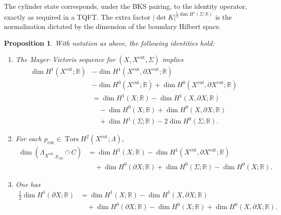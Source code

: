 \documentclass[12pt]{amsart}
\numberwithin{equation}{section}
\newtheorem{prop}[theorem]{Proposition}
\DeclareMathOperator{\Tors}{Tors}
\begin{document}
The cylinder state corresponds, under the BKS pairing, to the identity operator, exactly as required in a TQFT. The extra factor
\(|\det K|^{\frac14\dim H^1(\Sigma;\mathbb R)}\) is the normalization dictated by the dimension of the boundary Hilbert space.

\begin{prop}
\label{prop:dimension-identities-gluing}
With notation as above, the following identities hold:

\begin{enumerate}
\item[\textup{(i)}]
The Mayer--Vietoris sequence for $(X,X^{\mathrm{cut}},\Sigma)$ implies
\[
\begin{aligned}
\dim H^1(X^{\mathrm{cut}};\mathbb R)
&-\dim H^1(X^{\mathrm{cut}},\partial X^{\mathrm{cut}};\mathbb R) \\
&-\dim H^0(X^{\mathrm{cut}};\mathbb R)
+\dim H^0(X^{\mathrm{cut}},\partial X^{\mathrm{cut}};\mathbb R) \\
&=
\dim H^1(X;\mathbb R)
-\dim H^1(X,\partial X;\mathbb R) \\
&\quad
-\dim H^0(X;\mathbb R)
+\dim H^0(X,\partial X;\mathbb R) \\
&\quad
+\dim H^1(\Sigma;\mathbb R)
-2\dim H^0(\Sigma;\mathbb R).
\end{aligned}
\]
\item[\textup{(ii)}]
For each $p_{\mathrm{cut}}\in \Tors H^2(X^{\mathrm{cut}};\Lambda)$,
\[
\begin{aligned}
\dim(\Lambda_{X^{\mathrm{cut}},p_{\mathrm{cut}}}\cap C)
&=
\dim H^1(X;\mathbb R)
-\dim H^1(X^{\mathrm{cut}},\partial X^{\mathrm{cut}};\mathbb R) \\
&\quad
+\dim H^0(\partial X;\mathbb R)
+\dim H^0(\Sigma;\mathbb R)
-\dim H^0(X;\mathbb R).
\end{aligned}
\]
\item[\textup{(iii)}]
One has
\[
\begin{aligned}
\frac12\dim H^1(\partial X;\mathbb R)
&=
\dim H^1(X;\mathbb R)
-\dim H^1(X,\partial X;\mathbb R) \\
&\quad
+\dim H^0(\partial X;\mathbb R)
-\dim H^0(X;\mathbb R)
+\dim H^0(X,\partial X;\mathbb R).
\end{aligned}
\]
\end{enumerate}
\end{prop}
\end{document}

